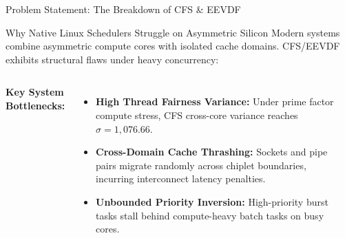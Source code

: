 \documentclass{beamer}
\begin{document}
\begin{frame}{Problem Statement: The Breakdown of CFS \& EEVDF}
  \begin{alertblock}{Why Native Linux Schedulers Struggle on Asymmetric Silicon}
    \footnotesize
    Modern systems combine asymmetric compute cores with isolated cache domains. CFS/EEVDF exhibits structural flaws under heavy concurrency:
  \end{alertblock}

  \vspace{0.15cm}
  \begin{columns}[T]
      \textbf{Key System Bottlenecks:}
      \begin{itemize}\itemsep3pt\scriptsize
        \item \textbf{High Thread Fairness Variance:} Under prime factor compute stress, CFS cross-core variance reaches $\sigma = 1,076.66$.
        \item \textbf{Cross-Domain Cache Thrashing:} Sockets and pipe pairs migrate randomly across chiplet boundaries, incurring interconnect latency penalties.
        \item \textbf{Unbounded Priority Inversion:} High-priority burst tasks stall behind compute-heavy batch tasks on busy cores.
      \end{itemize}

      \begin{center}
      \end{center}
  \end{columns}
\end{frame}
\end{document}
